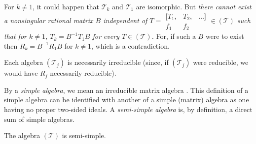 \begin{remark*}\label{rem:p14}
For $k\neq 1$, it could happen that $\mathscr{T}_k$ and
$\mathscr{T}_1$ are isomorphic. But {\em there cannot exist a nonsingular
rational matrix $B$ independent  of $T = \begin{smallmatrix} [T_1, &
 T_2, & \ldots]\\ f_1 & f_2 & \end{smallmatrix} \in
(\mathscr{T})$ such that for $k \neq 1$, $T_k = B^{-1} T_1 B$ for
every $T\in(\mathscr{T})$.} For, if such a $B$ were to exist then $R_k
= B^{-1} R_1 B$ for $k\neq 1$, which is a contradiction.

Each algebra $(\mathscr{T}_j)$ is necessarily irreducible (since, if
$(\mathscr{T}_j)$ were reducible, we would have $R_j$ necessarily
reducible).

By a {\em simple algebra}, we mean an irreducible matrix algebra
\cite{28}. This definition of a simple algebra can be identified with
another \pageoriginale of a simple (matrix) algebra as one having no
proper two-sided ideals. A {\em semi-simple algebra} is, by
definition, a direct sum of simple algebras.
\end{remark*}

\begin{proposition}
The algebra $(\mathscr{T})$ is semi-simple.
\end{proposition}

